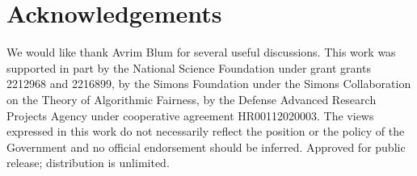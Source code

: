 \section*{Acknowledgements}
We would like thank Avrim Blum for several useful discussions.
This work was supported in part by the National Science Foundation under grant grants 2212968 and 2216899, by the Simons Foundation under the Simons Collaboration on the Theory of Algorithmic Fairness, by the Defense Advanced Research Projects Agency under cooperative agreement HR00112020003. The views expressed in this work do not necessarily reflect the position or the policy of the Government and no official endorsement should be inferred. Approved for public release; distribution is unlimited.